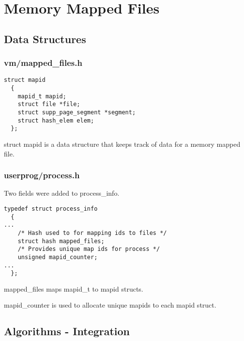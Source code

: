 \section{Memory Mapped Files}

\subsection{Data Structures}


\subsubsection*{vm/mapped\_files.h}

\begin{verbatim}
struct mapid
  {
    mapid_t mapid;
    struct file *file;
    struct supp_page_segment *segment;
    struct hash_elem elem;
  };
\end{verbatim}

struct mapid is a data structure that keeps track of data for a memory mapped
file.

\subsubsection*{userprog/process.h}

Two fields were added to process\_info.

\begin{verbatim}
typedef struct process_info
  {
...
    /* Hash used to for mapping ids to files */
    struct hash mapped_files;
    /* Provides unique map ids for process */
    unsigned mapid_counter;
...
  };
\end{verbatim}

mapped\_files maps mapid\_t to mapid structs.

mapid\_counter is used to allocate unique mapids to each mapid struct.

\subsection{Algorithms - Integration}


